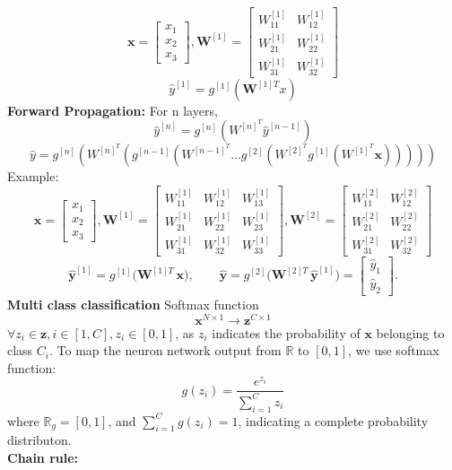 \documentclass[8pt,twocolumn]{article}
\begin{document}
\[\textbf{x} = \begin{bmatrix}
    x_1 \\ x_2\\x_3
    \end{bmatrix}, \textbf{W}^{[1]} = \begin{bmatrix}
        W^{[1]}_{11} & W^{[1]}_{12} \\ W^{[1]}_{21} & W^{[1]}_{22}\\ W^{[1]}_{31} & W^{[1]}_{32} 
        \end{bmatrix}\]
        \[\hat{y}^{[1]} = g^{[1]}(\textbf{W}^{[1]T}x)\]
\textbf{Forward Propagation:} For n layers, 
\[\hat{y}^{[n]} = g^{[n]}(W^{[n]^T}\hat{y}^{[n-1]})\]
\[\hat{y} = g^{[n]}(W^{[n]^T}(g^{[n-1]}(W^{[n-1]^T}... g^{[2]}(W^{[2]^T} g^{[1]}(W^{[1]^T}\textbf{x})))))\]
Example:
\[
\mathbf{x} = \begin{bmatrix}
  x_1 \\ x_2 \\ x_3
\end{bmatrix}, 
\mathbf{W}^{[1]} = \begin{bmatrix}
  W^{[1]}_{11} & W^{[1]}_{12} & W^{[1]}_{13} \\
  W^{[1]}_{21} & W^{[1]}_{22} & W^{[1]}_{23} \\
  W^{[1]}_{31} & W^{[1]}_{32} & W^{[1]}_{33}
\end{bmatrix}, 
\mathbf{W}^{[2]} = \begin{bmatrix}
  W^{[2]}_{11} & W^{[2]}_{12} \\
  W^{[2]}_{21} & W^{[2]}_{22} \\
  W^{[2]}_{31} & W^{[2]}_{32}
\end{bmatrix}
\]
\[
\hat{\mathbf{y}}^{[1]}
= g^{[1]}\bigl(\mathbf{W}^{[1]\!T}\,\mathbf{x}\bigr),
\qquad
\hat{\mathbf{y}}
= g^{[2]}\bigl(\mathbf{W}^{[2]\!T}\,\hat{\mathbf{y}}^{[1]}\bigr)
= \begin{bmatrix} \hat y_1 \\ \hat y_2 \end{bmatrix}.
\]
\textbf{Multi class classification}
Softmax function
\[\textbf{x}^{N\times 1} \rightarrow \textbf{z}^{C \times 1}\]
$\forall z_i \in \textbf{z}, i \in [1, C], z_i \in [0, 1]$, as $z_i$ indicates the probability of $\textbf{x}$ belonging to class $C_i$. 
To map the neuron network output from $\mathbb{R}$ to $[0, 1]$, we use softmax function: 
\[g(z_i) = \frac{e^{z_i}}{\sum_{i=1}^{C} z_i}\]
where $\mathbb{R}_g = [0, 1]$, and $\sum_{i=1}^{C} g(z_i) = 1$, indicating a complete probability distributon.\\
\textbf{Chain rule:}
\end{document}
